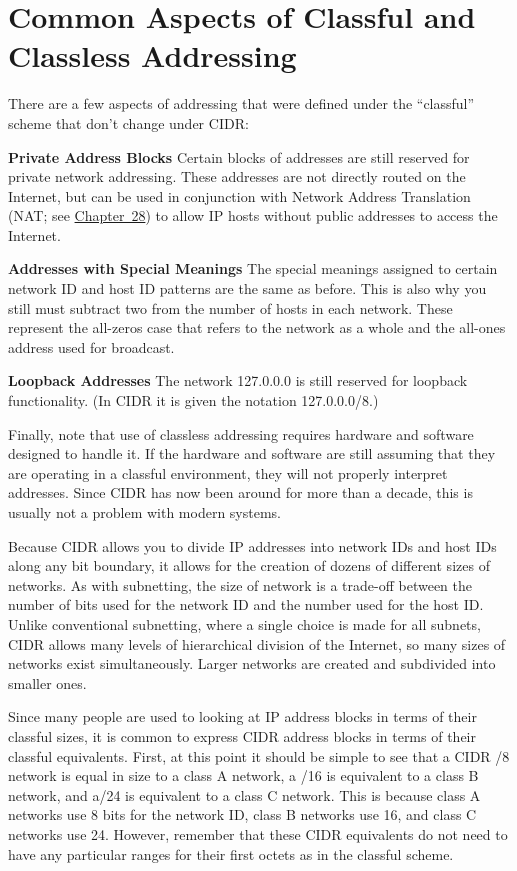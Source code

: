 \section{Common Aspects of Classful and Classless Addressing}

There are a few aspects of addressing that were defined under the
``classful'' scheme that don't change under CIDR:

{\textbf{Private Address Blocks}} Certain blocks of addresses are still
reserved for private network addressing. These addresses are not
directly routed on the Internet, but can be used in conjunction with
Network Address Translation (NAT; see
\protect\hyperlink{ch28.html}{Chapter~28}) to allow IP hosts without
public addresses to access the Internet.

{\textbf{Addresses with Special Meanings}} The special meanings assigned
to certain network ID and host ID patterns are the same as before. This
is also why you still must subtract two from the number of hosts in each
network. These represent the all-zeros case that refers to the network
as a whole and the all-ones address used for broadcast.

{\textbf{Loopback Addresses}} The network 127.0.0.0 is still reserved
for loopback functionality. (In CIDR it is given the notation
127.0.0.0/8.)

Finally, note that use of classless addressing requires hardware and
software designed to handle it. If the hardware and software are still
assuming that they are operating in a classful environment, they will
not properly interpret addresses. Since CIDR has now been around for
more than a decade, this is usually not a problem with modern systems.



Because CIDR allows you to divide IP addresses into network IDs and host
IDs along any bit boundary, it allows for the creation of dozens of
different sizes of networks. As with subnetting, the size of network is
a trade-off between the number of bits used for the network ID and the
number used for the host ID. Unlike conventional subnetting, where a
single choice is made for all subnets, CIDR allows many levels of
hierarchical division of the Internet, so many sizes of networks exist
simultaneously. Larger networks are created and subdivided into smaller
ones.

Since many people are used to looking at IP address
blocks in
terms of their classful sizes, it is common to express CIDR address
blocks in terms of their classful equivalents. First, at this point it
should be simple to see that a CIDR /8 network is equal in size to a
class A network, a /16 is equivalent to a class B network, and a/24 is
equivalent to a class C network. This is because class A networks use 8
bits for the network ID, class B networks use 16, and class C networks
use 24. However, remember that these CIDR equivalents do not need to
have any particular ranges for their first octets as in the classful
scheme.

